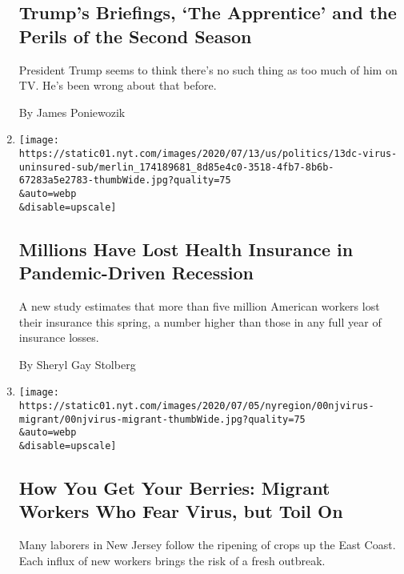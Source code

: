 \begin{enumerate}
  \hypertarget{trumps-briefings-the-apprentice-and-the-perils-of-the-second-season}{%
  \subsection{Trump's Briefings, `The Apprentice' and the Perils of the
  Second
  Season}\label{trumps-briefings-the-apprentice-and-the-perils-of-the-second-season}}

  President Trump seems to think there's no such thing as too much of
  him on TV. He's been wrong about that before.

  By James Poniewozik
\item
  \href{/2020/07/13/us/politics/coronavirus-health-insurance-trump.html}{}

  \texttt{[image: https://static01.nyt.com/images/2020/07/13/us/politics/13dc-virus-uninsured-sub/merlin\_174189681\_8d85e4c0-3518-4fb7-8b6b-67283a5e2783-thumbWide.jpg?quality=75\\\&auto=webp\\\&disable=upscale]}

  \hypertarget{millions-have-lost-health-insurance-in-pandemic-driven-recession}{%
  \subsection{Millions Have Lost Health Insurance in Pandemic-Driven
  Recession}\label{millions-have-lost-health-insurance-in-pandemic-driven-recession}}

  A new study estimates that more than five million American workers
  lost their insurance this spring, a number higher than those in any
  full year of insurance losses.

  By Sheryl Gay Stolberg
\item
  \href{/2020/07/05/nyregion/nj-migrant-workers-covid-19.html}{}

  \texttt{[image: https://static01.nyt.com/images/2020/07/05/nyregion/00njvirus-migrant/00njvirus-migrant-thumbWide.jpg?quality=75\\\&auto=webp\\\&disable=upscale]}

  \hypertarget{how-you-get-your-berries-migrant-workers-who-fear-virus-but-toil-on}{%
  \subsection{How You Get Your Berries: Migrant Workers Who Fear Virus,
  but Toil
  On}\label{how-you-get-your-berries-migrant-workers-who-fear-virus-but-toil-on}}

  Many laborers in New Jersey follow the ripening of crops up the East
  Coast. Each influx of new workers brings the risk of a fresh outbreak.


\end{enumerate}
